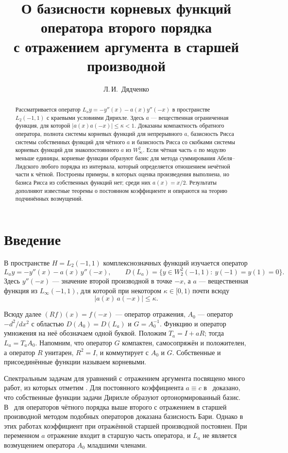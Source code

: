 \documentclass[12pt,a4paper]{article}
\title{О базисности корневых функций оператора второго порядка\\
с отражением аргумента в старшей производной}
\author{Л.\,И.~Дядченко}
\date{}
\theoremstyle{definition}
\newcommand{\abs}[1]{\lvert#1\rvert}
\begin{document}
\maketitle
\begin{abstract}
Рассматривается оператор $L_ay=-y''(x)-a(x)y''(-x)$ в пространстве $L_2(-1,1)$ с
краевыми условиями Дирихле. Здесь $a$ --- вещественная ограниченная функция, для которой
$\abs{a(x)a(-x)}\le\kappa<1$. Доказаны компактность обратного оператора, полнота системы
корневых функций для непрерывного $a$, базисность Рисса системы собственных функций для
чётного $a$ и базисность Рисса со скобками системы корневых функций для знакопостоянного
$a$ из $W^2_\infty$. Если чётная часть $a$ по модулю меньше единицы, корневые функции
образуют базис для метода суммирования Абеля--Лидского любого порядка из интервала,
который определяется отношением нечётной части к чётной. Построены примеры, в которых оценка произведения выполнена, но
базиса Рисса из собственных функций нет; среди них $a(x)=x/2$. Результаты дополняют
известные теоремы о постоянном коэффициенте и опираются на теорию подчинённых
возмущений.
\end{abstract}

\section{Введение}
В пространстве $H=L_2(-1,1)$ комплекснозначных функций изучается оператор
\begin{equation}\label{eq:op}
 L_ay=-y''(x)-a(x)\,y''(-x),\qquad
 D(L_a)=\{y\in W_2^2(-1,1):\ y(-1)=y(1)=0\}.
\end{equation}
Здесь $y''(-x)$ --- значение второй производной в точке $-x$, а $a$ --- вещественная
функция из $L_\infty(-1,1)$, для которой при некотором $\kappa\in[0,1)$ почти всюду
\begin{equation}\label{eq:bound}
 \abs{a(x)\,a(-x)}\le\kappa .
\end{equation}

Всюду далее $(Rf)(x)=f(-x)$ --- оператор отражения, $A_0$ --- оператор $-d^2/dx^2$ с
областью $D(A_0)=D(L_a)$ и $G=A_0^{-1}$. Функцию и оператор умножения на неё обозначаем
одной буквой. Положим $T_a=I+aR$; тогда $L_a=T_aA_0$. Напомним, что оператор $G$
компактен, самосопряжён и положителен, а оператор $R$ унитарен, $R^2=I$, и коммутирует с
$A_0$ и $G$. Собственные и присоединённые функции называем корневыми.

Спектральным задачам для уравнений с отражением аргумента посвящено много работ, из
которых отметим \cite{Pol,KS}. Для постоянного коэффициента $a\equiv c$
в~\cite[теорема~4.1]{KS} доказано, что собственные функции задачи Дирихле образуют
ортонормированный базис. В~\cite[теорема~1.1]{Pol} для операторов чётного порядка выше
второго с отражением в старшей производной методом подобных операторов доказана
базисность Бари. Однако в этих работах коэффициент при отражённой старшей производной
постоянен. При переменном $a$ отражение входит в старшую часть оператора, и $L_a$ не
является возмущением оператора $A_0$ младшими членами.
\end{document}
